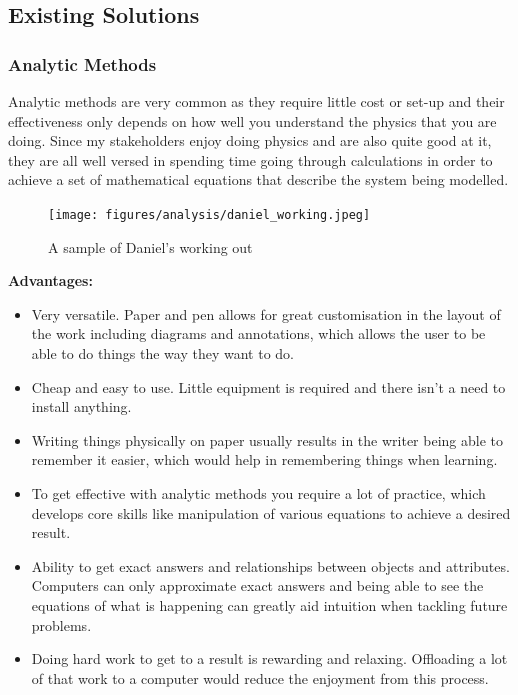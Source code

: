 \documentclass[11pt]{article}
\begin{document}
        \subsection{Existing Solutions}

            \subsubsection{Analytic Methods}
                Analytic methods are very common as they require little cost or set-up and their effectiveness only depends on how well you understand the physics that you are doing. Since my stakeholders enjoy doing physics and are also quite good at it, they are all well versed in spending time going through calculations in order to achieve a set of mathematical equations that describe the system being modelled. 

                \begin{figure}[!ht]
                    \centering
                    \texttt{[image: figures/analysis/daniel\_working.jpeg]}
                    \caption{A sample of Daniel's working out}
                    \label{fig:daniel_working}
                \end{figure}

                \pagebreak

                \textbf{Advantages:}
                \begin{itemize}
                    \item Very versatile. Paper and pen allows for great customisation in the layout of the work including diagrams and annotations, which allows the user to be able to do things the way they want to do.
                    \item Cheap and easy to use. Little equipment is required and there isn't a need to install anything. 
                    \item Writing things physically on paper usually results in the writer being able to remember it easier, which would help in remembering things when learning. 
                    \item To get effective with analytic methods you require a lot of practice, which develops core skills like manipulation of various equations to achieve a desired result.
                    \item Ability to get exact answers and relationships between objects and attributes. Computers can only approximate exact answers and being able to see the equations of what is happening can greatly aid intuition when tackling future problems.
                    \item Doing hard work to get to a result is rewarding and relaxing. Offloading a lot of that work to a computer would reduce the enjoyment from this process.
                \end{itemize}
\end{document}
